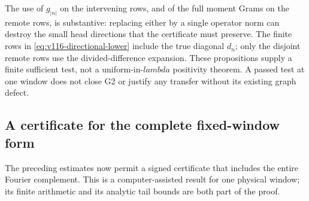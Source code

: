 \documentclass[11pt]{article}
\def\lambda{lambda}%
\theoremstyle{remark}
\begin{document}
The use of $g_{|n|}$ on the intervening rows, and of the full moment
Grams on the remote rows, is substantive: replacing either by a
single operator norm can destroy the small head directions that the
certificate must preserve.  The finite rows in
\eqref{eq:v116-directional-lower} include the true diagonal $d_n$;
only the disjoint remote rows use the divided-difference expansion.
These propositions supply a finite sufficient test, not a
uniform-in-$\lambda$ positivity theorem.  A passed test at one window
does not close G2 or justify any transfer without its existing graph
defect.

\subsection{A certificate for the complete fixed-window form}
The preceding estimates now permit a signed certificate that includes
the entire Fourier complement. This is a computer-assisted result for
one physical window; its finite arithmetic and its analytic tail bounds
are both part of the proof.
\end{document}
